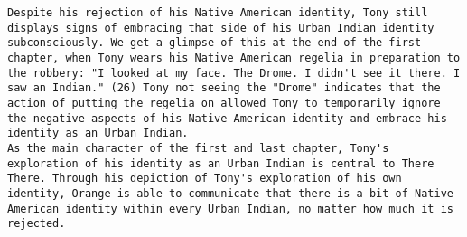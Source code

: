 \documentclass[letterpaper]{article}
\begin{document}
\begin{verbatim}
Despite his rejection of his Native American identity, Tony still displays signs of embracing that side of his Urban Indian identity subconsciously. We get a glimpse of this at the end of the first chapter, when Tony wears his Native American regelia in preparation to the robbery: "I looked at my face. The Drome. I didn't see it there. I saw an Indian." (26) Tony not seeing the "Drome" indicates that the action of putting the regelia on allowed Tony to temporarily ignore the negative aspects of his Native American identity and embrace his identity as an Urban Indian. 
As the main character of the first and last chapter, Tony's exploration of his identity as an Urban Indian is central to There There. Through his depiction of Tony's exploration of his own identity, Orange is able to communicate that there is a bit of Native American identity within every Urban Indian, no matter how much it is rejected.
\end{verbatim}
\end{document}
